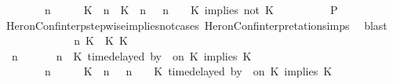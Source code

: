 \begin{isabellebody}
\ \ \ \ \ \ \ {\isacartoucheopen}{\isacharparenleft}{\isasymGamma}\ n\ {\isasymturnstile}\ {\isasymPsi}\ {\isasymtriangleright}\ {\isasymPhi}\ {\isacharequal}\ {\isacharparenleft}{\isacharparenleft}{\isacharparenleft}K\ {\isasymUp}\ n{\isacharparenright}\ {\isacharhash}\ {\isacharparenleft}K\ {\isasymnot}{\isasymUp}\ n{\isacharparenright}\ {\isacharhash}\ {\isasymGamma}{\isacharparenright}{\isacharcomma}\ n\ {\isasymturnstile}\ {\isasymPsi}\ {\isasymtriangleright}\ {\isacharparenleft}{\isacharparenleft}K\ implies\ not\ K\ {\isacharhash}\ {\isasymPhi}{\isacharparenright}{\isacharparenright}{\isacartoucheclose}\isanewline
\ \ \ \ \ \ \isamarkupfalse%
\ {\isacharquery}P\isanewline
\ \ \ \ \ \ \ \ \isamarkupfalse%
\ HeronConf{\isacharunderscore}interp{\isacharunderscore}stepwise{\isacharunderscore}implies{\isacharunderscore}not{\isacharunderscore}cases\ HeronConf{\isacharunderscore}interpretation{\isachardot}simps\ \isamarkupfalse%
\ blast\isanewline
\ \ \ \ \isamarkupfalse%
\isanewline
\ \ \ \ \ \ \isamarkupfalse%
\ {\isasymGamma}\ n\ K\ {\isasymdelta}{\isasymtau}\ K\ K\ {\isasymPsi}\ {\isasymPhi}\isanewline
\ \ \ \ \ \ \isamarkupfalse%
\ {\isacartoucheopen}{\isacharparenleft}{\isasymGamma}\ n\ {\isasymturnstile}\ {\isasymPsi}\ {\isasymtriangleright}\ {\isasymPhi}\ {\isacharequal}\ {\isacharparenleft}{\isasymGamma}{\isacharcomma}\ n\ {\isasymturnstile}\ {\isacharparenleft}{\isacharparenleft}K\ time{\isacharminus}delayed\ by\ {\isasymdelta}{\isasymtau}\ on\ K\ implies\ K\ {\isacharhash}\ {\isasymPsi}{\isacharparenright}\ {\isasymtriangleright}\ {\isasymPhi}{\isacharparenright}{\isacartoucheclose}\isanewline
\ \ \ \ \ \ \ {\isacartoucheopen}{\isacharparenleft}{\isasymGamma}\ n\ {\isasymturnstile}\ {\isasymPsi}\ {\isasymtriangleright}\ {\isasymPhi}\ {\isacharequal}\ {\isacharparenleft}{\isacharparenleft}{\isacharparenleft}K\ {\isasymnot}{\isasymUp}\ n{\isacharparenright}\ {\isacharhash}\ {\isasymGamma}{\isacharparenright}{\isacharcomma}\ n\ {\isasymturnstile}\ {\isasymPsi}\ {\isasymtriangleright}\ {\isacharparenleft}{\isacharparenleft}K\ time{\isacharminus}delayed\ by\ {\isasymdelta}{\isasymtau}\ on\ K\ implies\ K\ {\isacharhash}\ {\isasymPhi}{\isacharparenright}{\isacharparenright}{\isacartoucheclose}\isanewline

\end{isabellebody}
